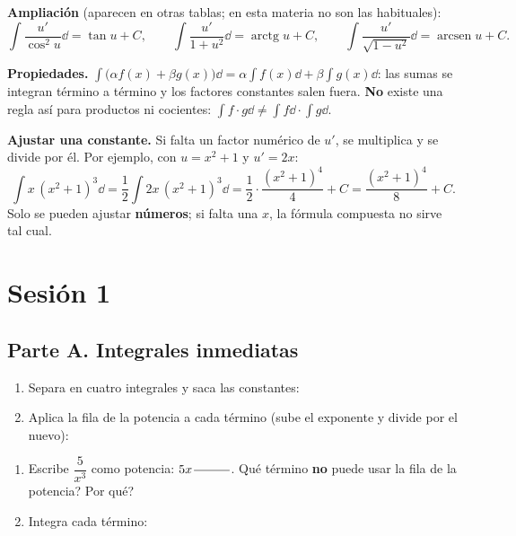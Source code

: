 \documentclass[11pt]{article}
\begin{document}
\textbf{Ampliación} (aparecen en otras tablas; en esta materia no son las habituales):
\[
\int\frac{u'}{\cos^2u}\dd=\tan u+C,\qquad \int\frac{u'}{1+u^2}\dd=\operatorname{arctg}u+C,\qquad \int\frac{u'}{\sqrt{1-u^2}}\dd=\operatorname{arcsen}u+C.
\]

\textbf{Propiedades.} \(\displaystyle\int\bigl(\alpha f(x)+\beta g(x)\bigr)\dd=\alpha\!\int f(x)\dd+\beta\!\int g(x)\dd\): las sumas se integran término a término y los factores constantes salen fuera. \textbf{No} existe una regla así para productos ni cocientes: \(\int f\cdot g\dd\ne\int f\dd\cdot\int g\dd\).

\textbf{Ajustar una constante.} Si falta un factor numérico de \(u'\), se multiplica y se divide por él. Por ejemplo, con \(u=x^2+1\) y \(u'=2x\):
\[\int x\,(x^2+1)^3\dd=\frac12\int 2x\,(x^2+1)^3\dd=\frac12\cdot\frac{(x^2+1)^4}{4}+C=\frac{(x^2+1)^4}{8}+C.\]
Solo se pueden ajustar \textbf{números}; si falta una \(x\), la fórmula compuesta no sirve tal cual.

\section*{Sesión 1}
\subsection*{Parte A. Integrales inmediatas}
\setcounter{ejercicio}{0}

\begin{enumerate}[label=\alph*)]
  \item Separa en cuatro integrales y saca las constantes: \hrulefill
  \item Aplica la fila de la potencia a cada término (sube el exponente y divide por el nuevo):\par\hrulefill
\end{enumerate}
\resultado\comprueba

\begin{enumerate}[label=\alph*)]
  \item Escribe \(\dfrac{5}{x^3}\) como potencia: \(5x^{\,\hueco[1cm]}\). \textquestiondown{}Qué término \textbf{no} puede usar la fila de la potencia? \hueco[3cm] \textquestiondown{}Por qué? \hueco[4cm]
  \item Integra cada término: \hueco[9cm]
\end{enumerate}
\resultado\comprueba
\end{document}
